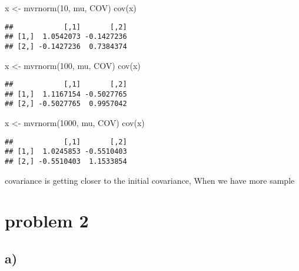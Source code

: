 \documentclass[
]{article}
\newenvironment{Shaded}{\begin{snugshade}}{\end{snugshade}}
\newcommand{\DecValTok}[1]{\textcolor[rgb]{0.00,0.00,0.81}{#1}}
\newcommand{\FunctionTok}[1]{\textcolor[rgb]{0.00,0.00,0.00}{#1}}
\newcommand{\NormalTok}[1]{#1}
\newcommand{\OtherTok}[1]{\textcolor[rgb]{0.56,0.35,0.01}{#1}}
\begin{document}
\begin{Shaded}
\begin{Highlighting}[]
\NormalTok{x }\OtherTok{\textless{}{-}} \FunctionTok{mvrnorm}\NormalTok{(}\DecValTok{10}\NormalTok{, mu, COV)}
\FunctionTok{cov}\NormalTok{(x)}
\end{Highlighting}
\end{Shaded}

\begin{verbatim}
##            [,1]       [,2]
## [1,]  1.0542073 -0.1427236
## [2,] -0.1427236  0.7384374
\end{verbatim}

\begin{Shaded}
\begin{Highlighting}[]
\NormalTok{x }\OtherTok{\textless{}{-}} \FunctionTok{mvrnorm}\NormalTok{(}\DecValTok{100}\NormalTok{, mu, COV)}
\FunctionTok{cov}\NormalTok{(x)}
\end{Highlighting}
\end{Shaded}

\begin{verbatim}
##            [,1]       [,2]
## [1,]  1.1167154 -0.5027765
## [2,] -0.5027765  0.9957042
\end{verbatim}

\begin{Shaded}
\begin{Highlighting}[]
\NormalTok{x }\OtherTok{\textless{}{-}} \FunctionTok{mvrnorm}\NormalTok{(}\DecValTok{1000}\NormalTok{, mu, COV)}
\FunctionTok{cov}\NormalTok{(x)}
\end{Highlighting}
\end{Shaded}

\begin{verbatim}
##            [,1]       [,2]
## [1,]  1.0245853 -0.5510403
## [2,] -0.5510403  1.1533854
\end{verbatim}

covariance is getting closer to the initial covariance, When we have
more sample

\hypertarget{problem-2}{%
\section{problem 2}\label{problem-2}}

\hypertarget{a-1}{%
\subsection{a)}\label{a-1}}
\end{document}
